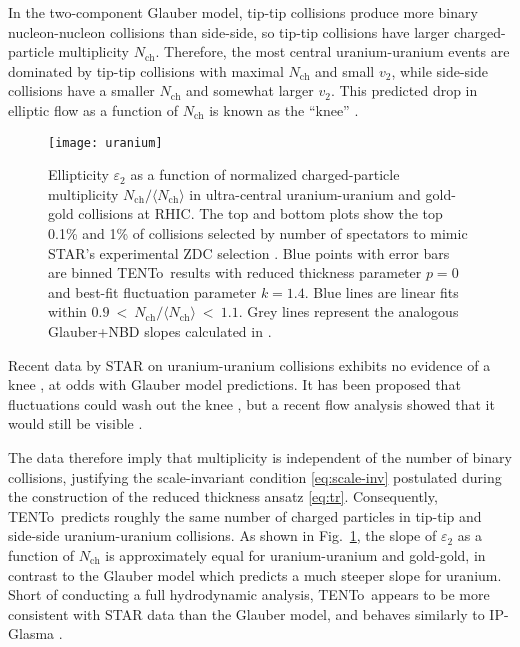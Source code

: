 \documentclass[aps,prc,reprint,amsmath]{revtex4-1}
\newcommand{\trento}{T\raisebox{-.5ex}{R}ENTo}
\newcommand{\avg}[1]{\langle #1 \rangle}
\newcommand{\nch}{N_\text{ch}}
\begin{document}
In the two-component Glauber model, tip-tip collisions produce more binary nucleon-nucleon collisions than side-side, so tip-tip collisions have larger charged-particle multiplicity $\nch$.
Therefore, the most central uranium-uranium events are dominated by tip-tip collisions with maximal $\nch$ and small $v_2$, while side-side collisions have a smaller $\nch$ and somewhat larger $v_2$.
This predicted drop in elliptic flow as a function of $\nch$ is known as the ``knee'' \cite{Voloshin:2010ut}.

\begin{figure}[t]
  \centering
  \texttt{[image: uranium]}
  \caption{
    \label{fig:uranium}
    Ellipticity $\varepsilon_2$ as a function of normalized charged-particle multiplicity $\nch/\avg\nch$ in ultra-central uranium-uranium and gold-gold collisions at RHIC.
    The top and bottom plots show the top 0.1\% and 1\% of collisions selected by number of spectators to mimic STAR's experimental ZDC selection \cite{FortheSTAR:2013bza}.
    Blue points with error bars are binned \protect\trento\ results with reduced thickness parameter $p = 0$ and best-fit fluctuation parameter $k = 1.4$.
    Blue lines are linear fits within $0.9~<~\nch/\avg\nch~<~1.1$.
    Grey lines represent the analogous Glauber+NBD slopes calculated in \cite{FortheSTAR:2013bza}.
  }
\end{figure}

Recent data by STAR on uranium-uranium collisions exhibits no evidence of a knee \cite{FortheSTAR:2013bza,Wang:2014qxa}, at odds with Glauber model predictions.
It has been proposed that fluctuations could wash out the knee \cite{Rybczynski:2012av}, but a recent flow analysis showed that it would still be visible \cite{Goldschmidt:2015qya}.

The data therefore imply that multiplicity is independent of the number of binary collisions, justifying the scale-invariant condition \eqref{eq:scale-inv} postulated during the construction of the reduced thickness ansatz \eqref{eq:tr}.
Consequently, \trento\ predicts roughly the same number of charged particles in tip-tip and side-side uranium-uranium collisions.
As shown in Fig.~\ref{fig:uranium}, the slope of $\varepsilon_2$ as a function of $\nch$ is approximately equal for uranium-uranium and gold-gold, in contrast to the Glauber model which predicts a much steeper slope for uranium.
Short of conducting a full hydrodynamic analysis, \trento\ appears to be more consistent with STAR data than the Glauber model, and behaves similarly to IP-Glasma \cite{Schenke:2014tga}.
\end{document}
